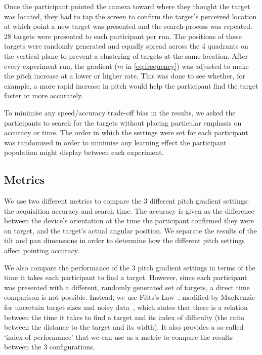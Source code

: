 \documentclass[sigconf, screen=true, anonymous=true]{acmart}
\begin{document}
Once the participant pointed the camera toward where they thought the target was located, they had to tap the screen to confirm the target's perceived location at which point a new target was presented and the search-process was repeated.
28 targets were presented to each participant per run.
The positions of these targets were randomly generated and equally spread across the 4 quadrants on the vertical plane to prevent a clustering of targets at the same location.
After every experiment run, the gradient ($m$ in \cref{eq:frequency}) was adjusted to make the pitch increase at a lower or higher rate.
This was done to see whether, for example, a more rapid increase in pitch would help the participant find the target faster or more accurately.

To minimise any speed/accuracy trade-off bias in the results, we asked the participants to search for the targets without placing particular emphasis on accuracy or time. 
The order in which the settings were set for each participant was randomised in order to minimise any learning effect the participant population might display between each experiment. 

\subsection{Metrics}

We use two different metrics to compare the 3 different pitch gradient settings: the acquisition accuracy and search time.
The accuracy is given as the difference between the device's orientation at the time the participant confirmed they were on target, and the target's actual angular position.
We separate the results of the tilt and pan dimensions in order to determine how the different pitch settings affect pointing accuracy. 

We also compare the performance of the 3 pitch gradient settings in terms of the time it takes each participant to find a target.
However, since each participant was presented with a different, randomly generated set of targets, a direct time comparison is not possible.
Instead, we use Fitts's Law~\cite{fitts1954information}, modified by MacKenzie for uncertain target sizes and noisy data~\cite{mackenzie1992fitts}, which states that there is a relation between the time it takes to find a target and its index of difficulty (the ratio between the distance to the target and its width).
It also provides a so-called `index of performance' that we can use as a metric to compare the results between the 3 configurations. 
\end{document}
